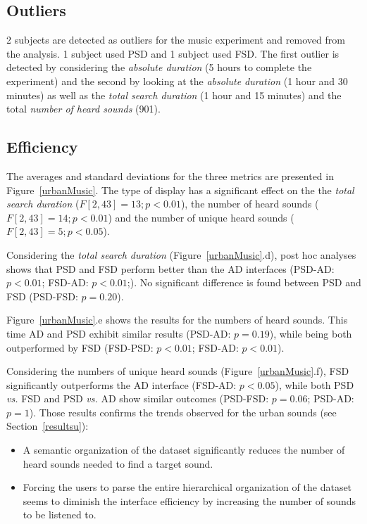 \documentclass{aes2e}
\begin{document}
\subsection{Outliers}

2 subjects are detected as outliers for the music experiment and removed from the analysis. 1 subject used PSD and 1 subject used FSD. The first outlier is detected by considering the \textit{absolute duration} (5 hours to complete the experiment) and the second by looking at the \textit{absolute duration} (1 hour and 30 minutes) as well as the \textit{total search duration} (1 hour and 15 minutes) and the total \textit{number of heard sounds} (901).

\subsection{Efficiency}

The averages and standard deviations for the three metrics are presented in Figure~\ref{urbanMusic}. The type of display has a significant effect on the the \textit{total search duration} ($F[2,43]=13; p<0.01$), the number of heard sounds ($F[2,43]=14; p<0.01$) and the number of unique heard sounds ($F[2,43]=5; p<0.05$).

Considering the \textit{total search duration} (Figure~\ref{urbanMusic}.d), post hoc analyses shows that PSD and FSD perform better than the AD interfaces (PSD-AD: $p<0.01$; FSD-AD: $p<0.01$;). No significant difference is found between PSD and FSD (PSD-FSD: $p=0.20$).

Figure~\ref{urbanMusic}.e shows the results for the numbers of heard sounds. This time AD and PSD exhibit similar results (PSD-AD: $p=0.19$), while being both outperformed by FSD (FSD-PSD: $p<0.01$; FSD-AD: $p<0.01$).

Considering the numbers of unique heard sounds (Figure~\ref{urbanMusic}.f), FSD significantly outperforms the AD interface (FSD-AD: $p<0.05$), while both PSD \emph{vs.} FSD and PSD \emph{vs.} AD show similar outcomes (PSD-FSD: $p=0.06$; PSD-AD: $p=1$). Those results confirms the trends observed for the urban sounds (see Section~\ref{resultsu}):

\begin{itemize}
\item A semantic organization of the dataset significantly reduces  the number of heard sounds needed to find a target sound.
\item Forcing the users to parse the entire hierarchical organization of the dataset seems to diminish the interface efficiency by increasing the number of sounds to be listened to.
\end{itemize}
\end{document}

